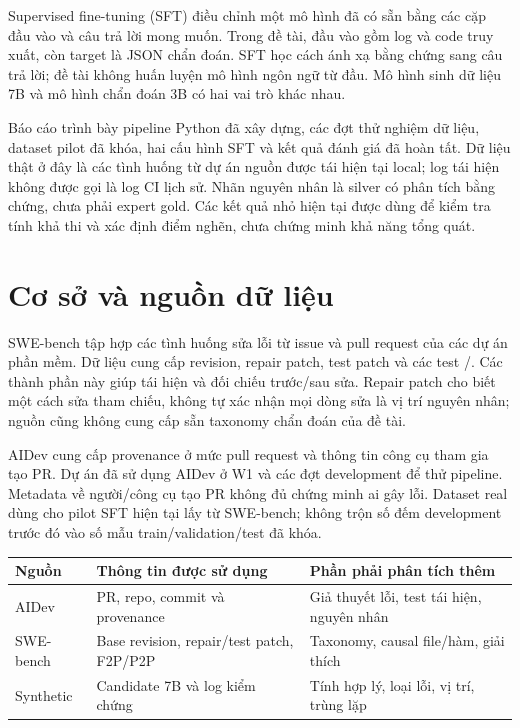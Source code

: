 \documentclass[12pt,a4paper]{article}
\begin{document}
Supervised fine-tuning (SFT) điều chỉnh một mô hình đã có sẵn bằng các cặp đầu vào và câu trả lời mong muốn. Trong đề tài, đầu vào gồm log và code truy xuất, còn target là JSON chẩn đoán. SFT học cách ánh xạ bằng chứng sang câu trả lời; đề tài không huấn luyện mô hình ngôn ngữ từ đầu. Mô hình sinh dữ liệu 7B và mô hình chẩn đoán 3B có hai vai trò khác nhau.

Báo cáo trình bày pipeline Python đã xây dựng, các đợt thử nghiệm dữ liệu, dataset pilot đã khóa, hai cấu hình SFT và kết quả đánh giá đã hoàn tất. Dữ liệu thật ở đây là các tình huống từ dự án nguồn được tái hiện tại local; log tái hiện không được gọi là log CI lịch sử. Nhãn nguyên nhân là silver có phân tích bằng chứng, chưa phải expert gold. Các kết quả nhỏ hiện tại được dùng để kiểm tra tính khả thi và xác định điểm nghẽn, chưa chứng minh khả năng tổng quát.

\nextpage
\section{Cơ sở và nguồn dữ liệu}
SWE-bench tập hợp các tình huống sửa lỗi từ issue và pull request của các dự án phần mềm\cite{swebench}. Dữ liệu cung cấp revision, repair patch, test patch và các test /. Các thành phần này giúp tái hiện và đối chiếu trước/sau sửa. Repair patch cho biết một cách sửa tham chiếu, không tự xác nhận mọi dòng sửa là vị trí nguyên nhân; nguồn cũng không cung cấp sẵn taxonomy chẩn đoán của đề tài.

AIDev cung cấp provenance ở mức pull request và thông tin công cụ tham gia tạo PR\cite{aidev}. Dự án đã sử dụng AIDev ở W1 và các đợt development để thử pipeline. Metadata về người/công cụ tạo PR không đủ chứng minh ai gây lỗi. Dataset real dùng cho pilot SFT hiện tại lấy từ SWE-bench; không trộn số đếm development trước đó vào số mẫu train/validation/test đã khóa.

\begin{center}\small
\begin{tabularx}{\linewidth}{lXX}\toprule
Nguồn & Thông tin được sử dụng & Phần phải phân tích thêm\\\midrule
AIDev & PR, repo, commit và provenance & Giả thuyết lỗi, test tái hiện, nguyên nhân\\
SWE-bench & Base revision, repair/test patch, F2P/P2P & Taxonomy, causal file/hàm, giải thích\\
Synthetic & Candidate 7B và log kiểm chứng & Tính hợp lý, loại lỗi, vị trí, trùng lặp\\\bottomrule
\end{tabularx}\end{center}
\end{document}
